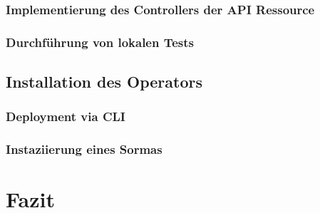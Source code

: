 \documentclass[a4paper,11pt]{article}
\begin{document}
      \subsubsection{Implementierung des Controllers der API Ressource}
      \subsubsection{Durchführung von lokalen Tests}
    \subsection{Installation des Operators}
      \subsubsection{Deployment via CLI}
      \subsubsection{Instaziierung eines Sormas}
  \section{Fazit}
\end{document}
